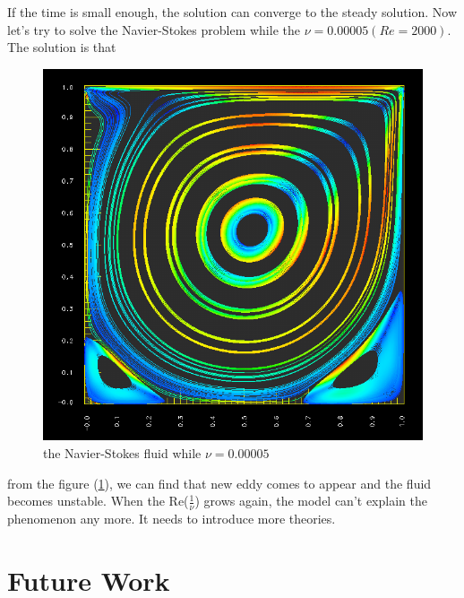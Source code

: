 \documentclass[a4paper]{article}
\begin{document}
If the time is small enough, the solution can converge to the steady solution. Now let's try to solve the Navier-Stokes problem while the $\nu=0.00005(Re=2000)$. The solution is that
\begin{figure}[h]
\centering
\includegraphics[scale = 0.5]{d.png}
\caption{the Navier-Stokes fluid while $\nu=0.00005$}
\label{im::d}
\end{figure}
from the figure (\ref{im::d}), we can find that new eddy comes to appear and the fluid becomes unstable. When the Re($\frac{1}{\nu}$) grows again, the model can't explain the phenomenon any more. It needs to introduce more theories.
\section{Future Work}
\end{document}
